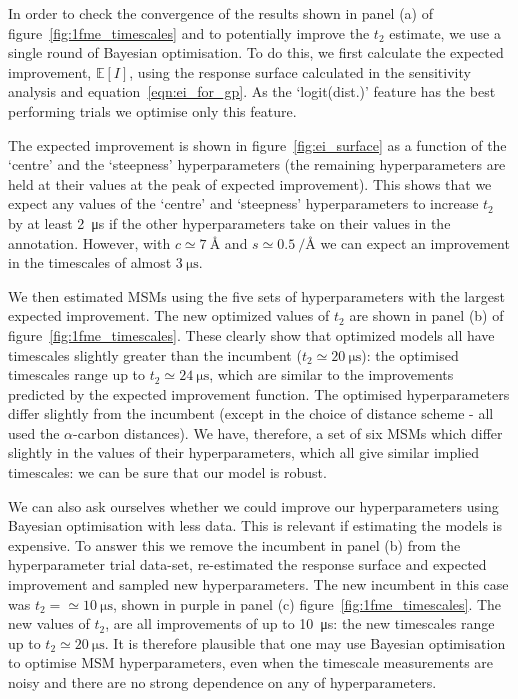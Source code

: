 \documentclass[journal=jacsat,manuscript=article]{achemso}
\begin{document}
In order to check the convergence of the results shown in panel (a) of figure~\ref{fig:1fme_timescales} and to potentially improve the $t_2$ estimate,  we use a single round of Bayesian optimisation. To do this, we first calculate the expected improvement, $\mathbb{E}[I]$,  using the response surface calculated in the sensitivity analysis and  equation~\ref{eqn:ei_for_gp}. As the `logit(dist.)' feature has the best performing trials we optimise only this feature. 


The expected improvement is shown in figure~\ref{fig:ei_surface} as a function of the `centre' and the `steepness' hyperparameters (the remaining hyperparameters are held at their values at the peak of expected improvement).  This shows that we expect any values of the `centre' and `steepness' hyperparameters to increase $t_2$ by at least \SI{2}{\micro\second} if the other hyperparameters take on their values in the annotation. However, with $c\simeq \SI{7}{\angstrom}$ and $s\simeq \SI{0.5}{\per\angstrom}$ we can expect an improvement in the timescales of almost $\SI{3}{\micro\second}$. 


We then estimated MSMs using the five sets of hyperparameters with the largest expected improvement. The new optimized values of $t_2$ are shown in panel (b) of figure~\ref{fig:1fme_timescales}.  These clearly show that optimized models all have timescales slightly greater than the incumbent ($t_2 \simeq \SI{20}{\micro\second}$):  the optimised timescales range up to $t_2 \simeq \SI{24}{\micro\second}$, which are similar to the improvements predicted by the expected improvement function. The optimised hyperparameters differ slightly from the incumbent (except in the choice of distance scheme - all used the $\alpha$-carbon distances). We have, therefore, a set of six MSMs which differ slightly in the values of their hyperparameters, which all give similar implied timescales: we can be sure that our model is robust. 


We can also ask ourselves whether we could improve our hyperparameters using Bayesian optimisation with less data. This is relevant if estimating the models is expensive. To answer this we remove the incumbent in panel (b) from the hyperparameter trial data-set, re-estimated the response surface and expected improvement and sampled new hyperparameters. The new incumbent in this case was $t_2 = \simeq \SI{10}{\micro\second}$, shown in purple in panel (c) figure~\ref{fig:1fme_timescales}.  The new values of $t_2$,  are all improvements of up to \SI{10}{\micro\second}: the new timescales range up to $t_2 \simeq \SI{20}{\micro\second}$. It is therefore plausible that one may use Bayesian optimisation to optimise MSM hyperparameters, even when the timescale measurements are noisy and there are no strong dependence on any of hyperparameters.  
\end{document}
